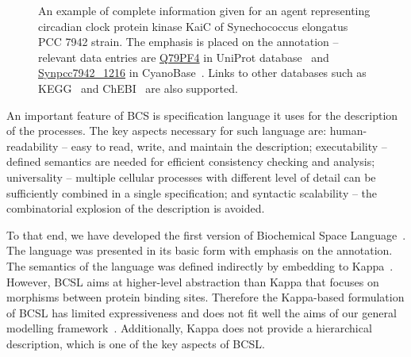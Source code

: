 \documentclass[11pt,a4paper]{report}
\begin{document}
\begin{figure}[!h]
  \begin{center}
  \end{center}
  \caption{An example of complete information given for an agent representing circadian clock protein kinase KaiC of Synechococcus elongatus PCC 7942 strain. The emphasis is placed on the annotation -- relevant data entries are \href{https://www.uniprot.org/uniprot/Q79PF4}{Q79PF4} in UniProt database~\cite{uniprot2016uniprot} and \href{http://genome.microbedb.jp/cyanobase/GCA_000012525.1/genes/Synpcc7942_1216}{Synpcc7942\_1216} in CyanoBase~\cite{nakao2009cyanobase}. Links to other databases such as KEGG~\cite{KEGG} and ChEBI~\cite{ChEBI} are also supported.}\label{entity_example}
\end{figure}

An important feature of BCS is specification language it uses for the description of the processes. The key aspects necessary for such language are: human-readability -- easy to read, write, and maintain the description; executability -- defined semantics are needed for efficient consistency checking and analysis; universality -- multiple cellular processes with different level of detail can be sufficiently combined in a single specification; and syntactic scalability -- the combinatorial explosion of the description is avoided.

To that end, we have developed the first version of Biochemical Space Language~\cite{dved2016formal}. The language was presented in its basic form with emphasis on the annotation. The semantics of the language was defined indirectly by embedding to Kappa~\cite{kappa_formal}. However, BCSL aims at higher-level abstraction than Kappa that focuses on morphisms between protein binding sites. Therefore the Kappa-based formulation of BCSL has limited expressiveness and does not fit well the aims of our general modelling framework~\cite{klement2013comprehensive}. Additionally, Kappa does not provide a hierarchical description, which is one of the key aspects of BCSL.
\end{document}
